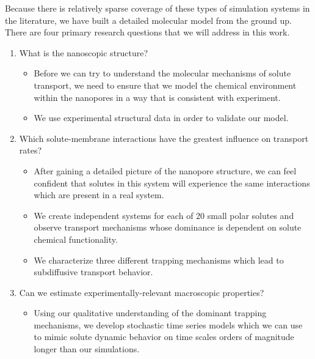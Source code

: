   Because there is relatively sparse coverage of these types of simulation systems in 
  the literature, we have built a detailed molecular model from the ground up. There 
  are four primary research questions that we will address in this work.
  \begin{enumerate}
    \item What is the nanoscopic structure?
    	\begin{itemize}
    	  \item Before we can try to understand the molecular mechanisms of solute
    	  transport, we need to ensure that we model the chemical environment
    	  within the nanopores in a way that is consistent with experiment.
    	  \item We use experimental structural data in order to validate our model.
    	\end{itemize}
    \item Which solute-membrane interactions have the greatest influence on transport rates?
    	\begin{itemize}
    	  \item After gaining a detailed picture of the nanopore structure, we can 
    	  feel confident that solutes in this system will experience the same 
    	  interactions which are present in a real system.
    	  \item We create independent systems for each of 20 small polar solutes 
    	  and observe transport mechanisms whose dominance is dependent on
    	  solute chemical functionality.
    	  \item We characterize three different trapping mechanisms which lead
    	  to subdiffusive transport behavior.
    	\end{itemize}
    \item Can we estimate experimentally-relevant macroscopic properties?
    	\begin{itemize}
    	  \item Using our qualitative understanding of the dominant trapping mechanisms,
    	  we develop stochastic time series models which we can use to mimic solute dynamic
    	  behavior on time scales orders of magnitude longer than our simulations. 

\end{itemize}
\end{enumerate}
